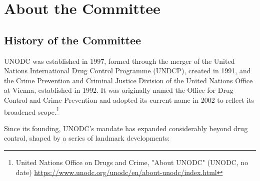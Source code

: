 \section{About the Committee}

\subsection{History of the Committee}

UNODC was established in 1997, formed through the merger of the United Nations International Drug Control Programme (UNDCP), created in 1991, and the Crime Prevention and Criminal Justice Division of the United Nations Office at Vienna, established in 1992. It was originally named the Office for Drug Control and Crime Prevention and adopted its current name in 2002 to reflect its broadened scope.\footnote{United Nations Office on Drugs and Crime, "About UNODC" (UNODC, no date) \url{https://www.unodc.org/unodc/en/about-unodc/index.html}}

Since its founding, UNODC's mandate has expanded considerably beyond drug control, shaped by a series of landmark developments:

